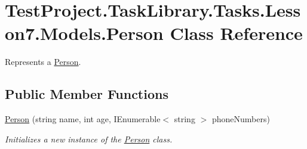 \hypertarget{class_test_project_1_1_task_library_1_1_tasks_1_1_lesson7_1_1_models_1_1_person}{}\section{Test\+Project.\+Task\+Library.\+Tasks.\+Lesson7.\+Models.\+Person Class Reference}
\label{class_test_project_1_1_task_library_1_1_tasks_1_1_lesson7_1_1_models_1_1_person}


Represents a \mbox{\hyperlink{class_test_project_1_1_task_library_1_1_tasks_1_1_lesson7_1_1_models_1_1_person}{Person}}.  


\subsection*{Public Member Functions}
\begin{DoxyCompactItemize}
\item 
\mbox{\hyperlink{class_test_project_1_1_task_library_1_1_tasks_1_1_lesson7_1_1_models_1_1_person_a958083175a01303465c08267fe845bec}{Person}} (string name, int age, I\+Enumerable$<$ string $>$ phone\+Numbers)
\begin{DoxyCompactList}\small\item\em Initializes a new instance of the \mbox{\hyperlink{class_test_project_1_1_task_library_1_1_tasks_1_1_lesson7_1_1_models_1_1_person}{Person}} class. \end{DoxyCompactList}\end{DoxyCompactItemize}
